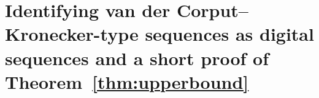 \documentclass{article}
\newcommand{\PP}{\mathbb P}
\newcommand{\FF}{\mathbb{F}}
\renewcommand{\(}{\left (}
\renewcommand{\)}{\right )}
\theoremstyle{definition}
\numberwithin{equation}{section}
\begin{document}


\section{Identifying van der Corput--Kronecker-type sequences as digital sequences and a short proof of Theorem~\ref{thm:upperbound}}\label{sec:prerequ}
\end{document}
